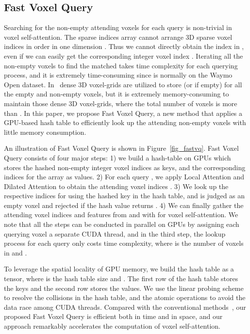 \documentclass[10pt,twocolumn,letterpaper]{article}
\begin{document}
\subsection{Fast Voxel Query}
Searching for the non-empty attending voxels for each query is non-trivial in voxel self-attention. The sparse indices array  cannot arrange 3D sparse voxel indices in order in one dimension . Thus we cannot directly obtain the index  in ,
even if we can easily get the corresponding integer voxel index . Iterating all the  non-empty voxels to find the matched  takes  time complexity for each querying process, and it is extremely time-consuming since  is normally  on the Waymo Open dataset. In~\cite{deng2020voxel} dense 3D voxel-grids are utilized to store  (or  if empty) for all the empty and non-empty voxels, but it is extremely memory-consuming to maintain those dense 3D voxel-grids, where the total number of voxels  is more than . In this paper, we propose Fast Voxel Query, a new method that applies a GPU-based hash table to efficiently look up the attending non-empty voxels with little memory consumption.  

An illustration of Fast Voxel Query is shown in Figure~\ref{fig_fastvq}. Fast Voxel Query consists of four major steps: 1) we build a hash-table on GPUs which stores the hashed non-empty integer voxel indices  as keys, and the corresponding indices  for the array  as values. 2) For each query , we apply Local Attention and Dilated Attention to obtain the attending voxel indices . 3) We look up the respective indices  for  using the hashed key  in the hash table, and  is judged as an empty voxel and rejected if the hash value returns . 4) We can finally gather the attending voxel indices  and features  from  and  with  for voxel self-attention. We note that all the steps can be conducted in parallel on GPUs by assigning each querying voxel  a separate CUDA thread, and in the third step, the lookup process for each query only costs  time complexity, where  is the number of voxels in  and .

To leverage the spatial locality of GPU memory, we build the hash table as a  tensor, where  is the hash table size and . The first row of the  hash table stores the keys and the second row stores the values. We use the linear probing scheme to resolve the collisions in the hash table, and the atomic operations to avoid the data race among CUDA threads. Compared with the conventional methods~\cite{qi2017pointnet++, deng2020voxel}, our proposed Fast Voxel Query is efficient both in time and in space, and our approach remarkably accelerates the computation of voxel self-attention.
\end{document}

